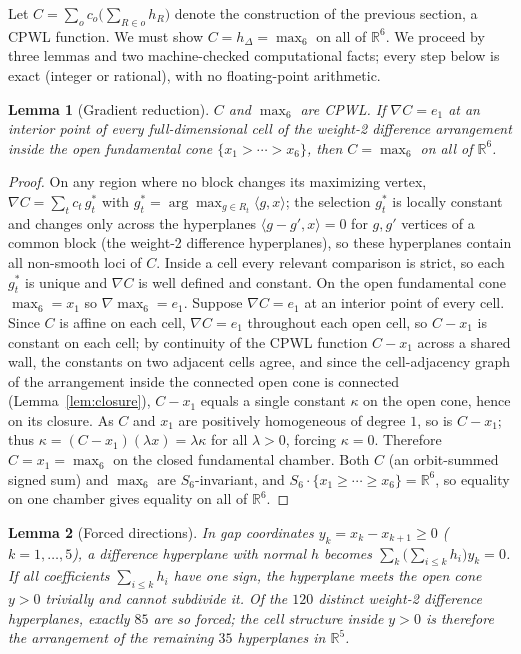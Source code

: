 \documentclass[11pt]{article}
\newtheorem{lemma}{Lemma}
\theoremstyle{definition}
\newcommand{\RR}{\mathbb{R}}
\begin{document}
Let $C=\sum_{o} c_o\big(\sum_{R\in o}h_R\big)$ denote the construction of the previous section, a CPWL
function. We must show $C=h_\Delta=\max_6$ on all of $\RR^6$. We proceed by three lemmas and two
machine-checked computational facts; every step below is exact (integer or rational), with no
floating-point arithmetic.

\begin{lemma}[Gradient reduction]\label{lem:grad}
$C$ and $\max_6$ are CPWL. If $\nabla C=e_1$ at an interior point of every full-dimensional cell of the
weight-2 difference arrangement inside the open fundamental cone $\{x_1>\cdots>x_6\}$, then $C=\max_6$ on
all of $\RR^6$.
\end{lemma}

\begin{proof}
On any region where no block changes its maximizing vertex, $\nabla C=\sum_t c_t\,g_t^\ast$ with
$g_t^\ast=\arg\max_{g\in R_t}\langle g,x\rangle$; the selection $g_t^\ast$ is locally constant and changes
only across the hyperplanes $\langle g-g',x\rangle=0$ for $g,g'$ vertices of a common block (the weight-2
difference hyperplanes), so these hyperplanes contain all non-smooth loci of $C$. Inside a cell every
relevant comparison is strict, so each $g_t^\ast$ is unique and $\nabla C$ is well defined and constant.
On the open fundamental cone $\max_6=x_1$ so $\nabla\max_6=e_1$. Suppose $\nabla C=e_1$ at an interior
point of every cell. Since $C$ is affine on each cell, $\nabla C=e_1$ throughout each open cell, so $C-x_1$
is constant on each cell; by continuity of the CPWL function $C-x_1$ across a shared wall, the constants on
two adjacent cells agree, and since the cell-adjacency graph of the arrangement inside the connected open
cone is connected (Lemma~\ref{lem:closure}), $C-x_1$ equals a single constant $\kappa$ on the open cone,
hence on its closure. As $C$ and $x_1$ are positively homogeneous of degree $1$, so is $C-x_1$; thus
$\kappa=(C-x_1)(\lambda x)=\lambda\kappa$ for all $\lambda>0$, forcing $\kappa=0$. Therefore $C=x_1=\max_6$
on the closed fundamental chamber. Both $C$ (an orbit-summed signed sum) and $\max_6$ are $S_6$-invariant,
and $S_6\cdot\{x_1\ge\cdots\ge x_6\}=\RR^6$, so equality on one chamber gives equality on all of $\RR^6$.
\end{proof}

\begin{lemma}[Forced directions]\label{lem:forced}
In gap coordinates $y_k=x_k-x_{k+1}\ge 0$ ($k=1,\dots,5$), a difference hyperplane with normal $h$ becomes
$\sum_k\big(\sum_{i\le k}h_i\big)y_k=0$. If all coefficients $\sum_{i\le k}h_i$ have one sign, the
hyperplane meets the open cone $y>0$ trivially and cannot subdivide it. Of the $120$ distinct weight-2
difference hyperplanes, exactly $85$ are so forced; the cell structure inside $y>0$ is therefore the
arrangement of the remaining $35$ hyperplanes in $\RR^5$.
\end{lemma}
\end{document}
